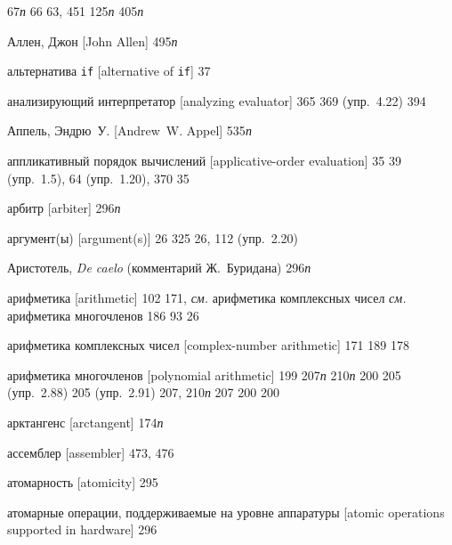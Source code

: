 \begin{theindex}
   67{\it п}
   66
   63, 451
   125{\it п}
   405{\it п}
\item {Аллен, Джон [John Allen]} 495{\it п}
\item {альтернатива \texttt{if} [alternative of {\tt if}]} 37
\item {анализирующий интерпретатор [analyzing evaluator]} 365
   369 (упр.~4.22)
   394
\item {Аппель, Эндрю~У. [Andrew~W. Appel]} 535{\it п}
\item {аппликативный порядок вычислений [applicative-order evaluation]} 35
   39 (упр.~1.5), 64 (упр.~1.20), 370
   35
\item {арбитр [arbiter]} 296{\it п}
\item {аргумент(ы) [argument(s)]} 26
   325
   26, 112 (упр.~2.20)
\item {Аристотель, {\em De caelo} (комментарий Ж.~Буридана)} 296{\it п}
\item {арифметика [arithmetic]}
   102
   171, {\it см.} арифметика комплексных чисел
   {\it см.} арифметика многочленов
   186
   93
   26
\item {арифметика комплексных чисел [complex-number arithmetic]} 171
   189
   178
\item {арифметика многочленов [polynomial arithmetic]} 199
   207{\it п}
   210{\it п}
   200
   205 (упр.~2.88)
   205 (упр.~2.91)
   207, 210{\it п}
   207
   200
   200
\item {арктангенс [arctangent]} 174{\it п}
\item {ассемблер [assembler]} 473, 476
\item {атомарность [atomicity]} 295
\item {атомарные операции, поддерживаемые на уровне аппаратуры [atomic operations supported in hardware]} 296

\end{theindex}
